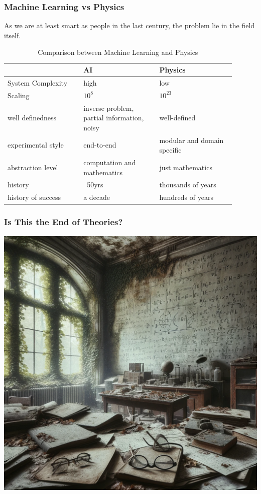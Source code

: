 \documentclass{beamer}   	%
\theoremstyle{definition}
\begin{document}
\begin{frame}
\frametitle{Machine Learning vs Physics}

As we are at least smart as people in the last century, the problem lie in the field itself.

\begin{table}[h]
\centering
\begin{tabular}{|>{\centering\arraybackslash}m{0.3\linewidth}|>{\centering\arraybackslash}m{0.3\linewidth}|>{\centering\arraybackslash}m{0.3\linewidth}|}
\hline
 & \textbf{AI} & \textbf{Physics} \\ 
\hline
System Complexity & high & low \\
\hline
Scaling & \(10^8\) & \(10^{23}\) \\
\hline
well definedness & inverse problem, partial information, noisy & well-defined \\
\hline
experimental style & end-to-end & modular and domain specific \\
\hline
abstraction level & computation and mathematics & just mathematics \\
\hline
history & ~50yrs & thousands of years \\
\hline
history of success & a decade & hundreds of years \\
\hline
\end{tabular}
\caption{Comparison between Machine Learning and Physics}
\label{table:comparison}
\end{table}
\end{frame}

\begin{frame}
\frametitle{Is This the End of Theories?}
\includegraphics[width=\linewidth]{forgotten_theories.png}
\end{frame}
\end{document}
